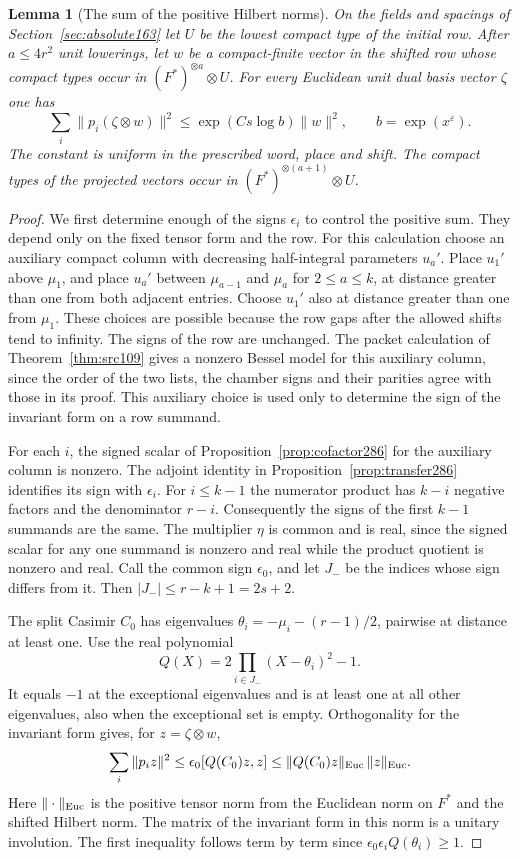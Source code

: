 \documentclass[a4paper,11pt]{article}
\newtheorem{lemma}[proposition]{Lemma}
\theoremstyle{definition}
\theoremstyle{remark}
\numberwithin{equation}{section}
\begin{document}
\begin{lemma}[The sum of the positive Hilbert norms]\leavevmode
\label{lem:signs286}
On the fields and spacings of Section~\ref{sec:absolute163}
let \(U\) be the lowest compact type of the initial row.
After \(a\le 4r^2\) unit lowerings, let \(w\) be a
compact-finite vector in the shifted row whose compact types
occur in \((F^*)^{\otimes a}\otimes U\). For every Euclidean
unit dual basis vector \(\zeta\) one has
\[
       \sum_i\|p_i(\zeta\otimes w)\|^2
                    \le \exp(C s\log b)\|w\|^2,\qquad
                     b=\exp(x^\varepsilon).
\]
The constant is uniform in the prescribed word, place and
shift. The compact types of the projected vectors occur in
\((F^*)^{\otimes(a+1)}\otimes U\).
\end{lemma}
\begin{proof}
We first determine enough of the signs \(\epsilon_i\) to
control the positive sum. They depend only on the fixed
tensor form and the row. For this calculation choose an
auxiliary compact column with decreasing half-integral
parameters \(u_a'\). Place \(u_1'\) above \(\mu_1\), and
place \(u_a'\) between \(\mu_{a-1}\) and \(\mu_a\) for
\(2\le a\le k\), at distance greater than one from both
adjacent entries. Choose \(u_1'\) also at distance greater
than one from \(\mu_1\). These choices are possible because
the row gaps after the allowed shifts tend to infinity.
The signs of the row are unchanged. The packet calculation of
Theorem~\ref{thm:src109} gives a nonzero Bessel model for
this auxiliary column, since the order of the two lists,
the chamber signs and their parities agree with those in
its proof. This auxiliary choice is used only to determine the
sign of the invariant form on a row summand.

For each \(i\), the signed scalar of
Proposition~\ref{prop:cofactor286} for the auxiliary column
is nonzero. The adjoint identity in
Proposition~\ref{prop:transfer286} identifies its sign
with \(\epsilon_i\). For \(i\le k-1\) the numerator product
has \(k-i\) negative factors and the denominator \(r-i\).
Consequently the signs of the first \(k-1\) summands are
the same. The multiplier \(\eta\) is common and is real,
since the signed scalar for any one summand is nonzero and
real while the product quotient is nonzero and real.
Call the common sign \(\epsilon_0\), and let \(J_-\)
be the indices whose sign differs from it. Then
\(|J_-|\le r-k+1=2s+2\).

The split Casimir \(C_0\) has eigenvalues
\(\theta_i=-\mu_i-(r-1)/2\), pairwise at distance at least one.
Use the real polynomial
\[
 Q(X)=2\prod_{i\in J_-}(X-\theta_i)^2-1 .
\]
It equals \(-1\) at the exceptional eigenvalues and is
at least one at all other eigenvalues, also when the exceptional
set is empty. Orthogonality for the invariant form gives,
for \(z=\zeta\otimes w\),
\[
 \sum_i\|p_i z\|^2\le
      \epsilon_0[Q(C_0)z,z]\le\|Q(C_0)z\|_{\rm Euc}\,\|z\|_{\rm Euc}.
\]
Here \(\|\cdot\|_{\rm Euc}\) is the positive tensor norm from
the Euclidean norm on \(F^*\) and the shifted Hilbert norm.
The matrix of the invariant form in this norm is a unitary
involution. The first inequality follows term by term since
\(\epsilon_0\epsilon_i Q(\theta_i)\ge1\).


\end{proof}
\end{document}
